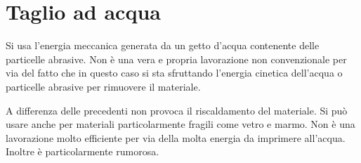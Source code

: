 \section{Taglio ad acqua}
Si usa l'energia meccanica generata da un getto d'acqua contenente delle particelle abrasive.
Non è una vera e propria lavorazione non convenzionale per via del fatto che in questo caso si sta sfruttando l'energia cinetica dell'acqua o particelle abrasive per rimuovere il materiale.

A differenza delle precedenti non provoca il riscaldamento del materiale.
Si può usare anche per materiali particolarmente fragili come vetro e marmo.
Non è una lavorazione molto efficiente per via della molta energia da imprimere all'acqua. Inoltre è particolarmente rumorosa.